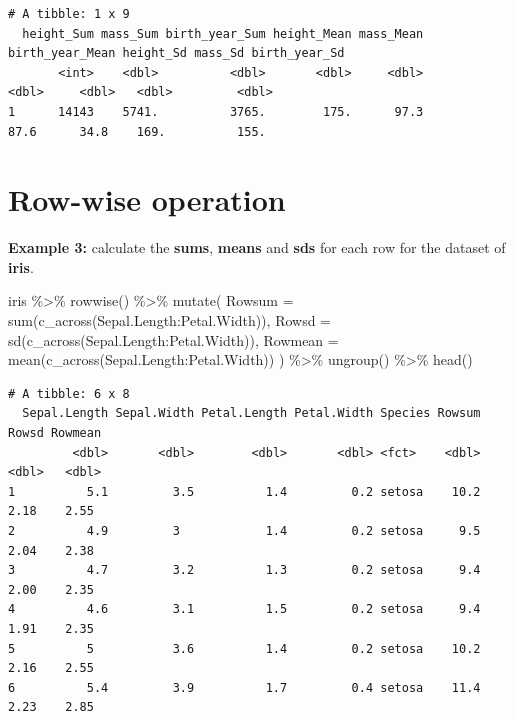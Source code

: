 \documentclass[
  letterpaper,
  DIV=11,
  numbers=noendperiod]{scrartcl}
\newenvironment{Shaded}{}{}
\newcommand{\AttributeTok}[1]{\textcolor[rgb]{0.65,0.15,0.64}{#1}}
\newcommand{\FunctionTok}[1]{\textcolor[rgb]{0.25,0.47,0.95}{#1}}
\newcommand{\NormalTok}[1]{\textcolor[rgb]{0.22,0.23,0.26}{#1}}
\newcommand{\SpecialCharTok}[1]{\textcolor[rgb]{0.00,0.52,0.74}{#1}}
\begin{document}
\begin{verbatim}
# A tibble: 1 x 9
  height_Sum mass_Sum birth_year_Sum height_Mean mass_Mean birth_year_Mean height_Sd mass_Sd birth_year_Sd
       <int>    <dbl>          <dbl>       <dbl>     <dbl>           <dbl>     <dbl>   <dbl>         <dbl>
1      14143    5741.          3765.        175.      97.3            87.6      34.8    169.          155.
\end{verbatim}

\section{Row-wise operation}\label{row-wise-operation}

\textbf{Example 3:} calculate the \textbf{sums}, \textbf{means} and
\textbf{sds} for each row for the dataset of \textbf{iris}.

\begin{Shaded}
\begin{Highlighting}[]
\NormalTok{iris }\SpecialCharTok{\%\textgreater{}\%}
  \FunctionTok{rowwise}\NormalTok{() }\SpecialCharTok{\%\textgreater{}\%}
  \FunctionTok{mutate}\NormalTok{(}
    \AttributeTok{Rowsum =} \FunctionTok{sum}\NormalTok{(}\FunctionTok{c\_across}\NormalTok{(Sepal.Length}\SpecialCharTok{:}\NormalTok{Petal.Width)),}
    \AttributeTok{Rowsd =} \FunctionTok{sd}\NormalTok{(}\FunctionTok{c\_across}\NormalTok{(Sepal.Length}\SpecialCharTok{:}\NormalTok{Petal.Width)),}
    \AttributeTok{Rowmean =} \FunctionTok{mean}\NormalTok{(}\FunctionTok{c\_across}\NormalTok{(Sepal.Length}\SpecialCharTok{:}\NormalTok{Petal.Width))}
\NormalTok{  ) }\SpecialCharTok{\%\textgreater{}\%}
  \FunctionTok{ungroup}\NormalTok{() }\SpecialCharTok{\%\textgreater{}\%}
  \FunctionTok{head}\NormalTok{()}
\end{Highlighting}
\end{Shaded}

\begin{verbatim}
# A tibble: 6 x 8
  Sepal.Length Sepal.Width Petal.Length Petal.Width Species Rowsum Rowsd Rowmean
         <dbl>       <dbl>        <dbl>       <dbl> <fct>    <dbl> <dbl>   <dbl>
1          5.1         3.5          1.4         0.2 setosa    10.2  2.18    2.55
2          4.9         3            1.4         0.2 setosa     9.5  2.04    2.38
3          4.7         3.2          1.3         0.2 setosa     9.4  2.00    2.35
4          4.6         3.1          1.5         0.2 setosa     9.4  1.91    2.35
5          5           3.6          1.4         0.2 setosa    10.2  2.16    2.55
6          5.4         3.9          1.7         0.4 setosa    11.4  2.23    2.85
\end{verbatim}
\end{document}
